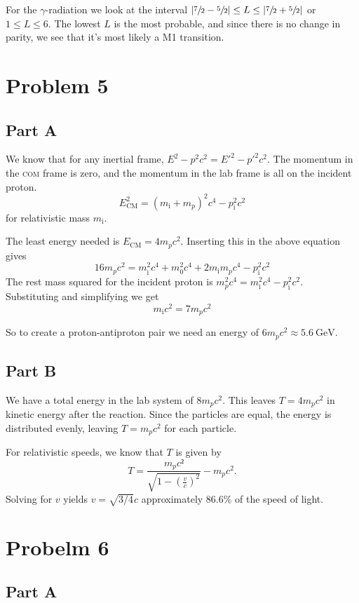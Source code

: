 \documentclass[a4paper, parskip=half, twopage]{scrartcl}
\begin{document}
For the $\gamma$-radiation we look at the interval $|\sfrac 7 2 - \sfrac 5 2 | \leq L \leq | \sfrac 7 2 + \sfrac 5 2 |$ or $1 \leq L \leq 6$. The lowest $L$ is the most probable, and since there is no change in parity, we see that it's most likely a M1 transition.

\section*{Problem 5}

\subsection*{Part A}
We know that for any inertial frame, $E^2 - p^2 c^2 = E'^2 - p'^2 c^2$. The momentum in the \textsc{com} frame is zero, and the momentum in the lab frame is all on the incident proton.
\[
E_{\mathrm{CM}}^2 = (m_\mathrm{i} + m_p)^2 c^4 - p_\mathrm{i}^2 c^2
\]
for relativistic mass $m_\mathrm{i}$.

The least energy needed is $E_\mathrm{CM} = 4 m_p c^2$. Inserting this in the above equation gives
\[
16 m_p c^2 = m_\mathrm{i}^2 c^4 + m_0^2 c^4 + 2 m_\mathrm{i} m_p c^4 - p_\mathrm{i}^2 c^2
\]
The rest mass squared for the incident proton is $m_p^2 c^4 = m_\mathrm{i}^2 c^4 - p_\mathrm{i}^2 c^2$. Substituting and simplifying we get
\[
m_\mathrm{i} c^2 = 7 m_p c^2
\]

So to create a proton-antiproton pair we need an energy of $6m_p c^2 \approx \SI{5.6}{\GeV}$.

\subsection*{Part B}
We have a total energy in the lab system of $8m_p c^2$. This leaves $T = 4m_p c^2$ in kinetic energy after the reaction. Since the particles are equal, the energy is distributed evenly, leaving $T = m_pc^2$ for each particle.

For relativistic speeds, we know that $T$ is given by
\[
T = \frac{m_pc²}{\sqrt{1-\left( \frac{v}{c} \right)^2}} - m_p c^2 .
\]
Solving for $v$ yields $v = \sqrt{3/4} c$ approximately 86.6\% of the speed of light.
\section*{Probelm 6}

\subsection*{Part A}
\end{document}
